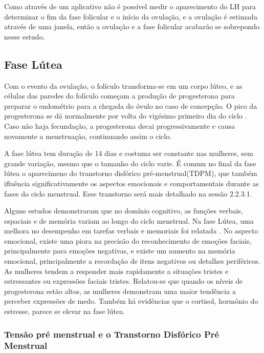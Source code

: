 Como através de um aplicativo não é possível medir o aparecimento do LH 
para determinar o fim da fase folicular e o início da ovulação, 
e a ovulação é estimada através de uma janela, então a ovulação e a fase 
folicular acabarão se sobrepondo nesse estudo.

\subsection{Fase Lútea}

Com o evento da ovulação, o folículo transforma-se em um corpo lúteo, e as 
células das paredes do folículo começam a produção de progesterona para 
preparar o endométrio para a chegada do óvulo no caso de concepção. 
O pico da progesterona se dá normalmente por volta do vigésimo primeiro 
dia do ciclo \cite{nikas2003}. Caso não haja fecundação, a progesterona 
decai progressivamente e causa novamente a menstruação, continuando assim 
o ciclo.

A fase lútea tem duração de 14 dias e costuma ser constante nas mulheres, 
sem grande variação, mesmo que o tamanho do ciclo varie. É comum no final 
da fase lútea o aparecimeno do transtorno disfórico pré-menstrual(TDPM), 
que também ifluência significativamente os aspectos emocionais e 
comportamentais durante as fases do ciclo menstrual. Esse transtorno 
será mais detalhado na sessão 2.2.3.1.

Alguns estudos demonstraram que no domínio cognitivo, as funções verbais, 
espaciais e de memória variam ao longo do ciclo menstrual. Na fase Lútea, 
uma melhora no desempenho em tarefas verbais e memoriais foi relatada 
\cite{hausmann2000}. No aspecto emocional, existe uma piora na precisão 
do reconhecimento de emoções faciais, principalmente para emoções negativas, 
e existe um aumento na memória emocional, principalmente a recordação de 
itens negativos ou detalhes periféricos. As mulheres tendem a responder 
mais rapidamente a situações tristes e estressantes ou expressões faciais 
tristes. Relatou-se que quando os níveis de progesterona estão altos, as 
mulheres demonstram uma maior tendência a perceber expressões de medo. 
Também há evidências que o cortisol, hormônio do estresse, parece se elevar 
na fase lútea\cite{kirschbaum1999}.

\subsubsection{Tensão pré menstrual e o Transtorno Disfórico Pré Menstrual}

